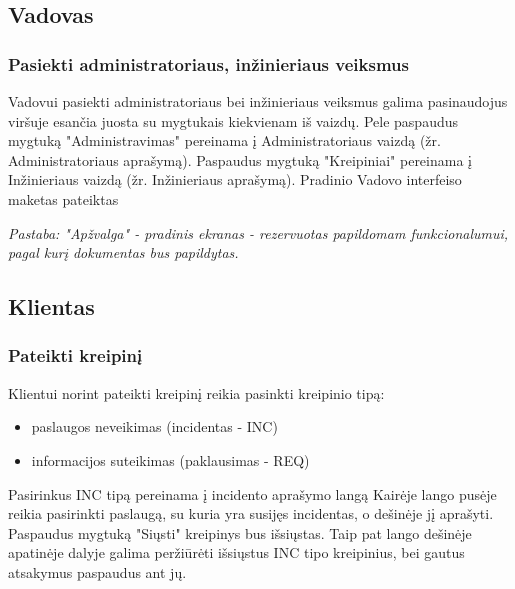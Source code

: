 

\subsection{Vadovas}

	\subsubsection{Pasiekti administratoriaus, inžinieriaus veiksmus}
		
	Vadovui pasiekti administratoriaus bei inžinieriaus veiksmus galima pasinaudojus viršuje esančia juosta su mygtukais kiekvienam iš vaizdų.
	Pele paspaudus mygtuką "Administravimas" pereinama į Administratoriaus vaizdą (žr. Administratoriaus aprašymą).
	Paspaudus mygtuką "Kreipiniai" pereinama į Inžinieriaus vaizdą (žr. Inžinieriaus aprašymą).
	Pradinio Vadovo interfeiso maketas pateiktas 
	
	\textit{Pastaba: "Apžvalga" - pradinis ekranas - rezervuotas papildomam funkcionalumui, pagal kurį dokumentas bus papildytas.}
	
	
\subsection{Klientas}

	\subsubsection{Pateikti kreipinį}
	
	Klientui norint pateikti kreipinį reikia pasinkti kreipinio tipą:
	
	\begin{itemize}
		\item paslaugos neveikimas (incidentas - INC)
		\item informacijos suteikimas (paklausimas - REQ)
	\end{itemize}
	
	Pasirinkus INC tipą pereinama į incidento aprašymo langą 
	Kairėje lango pusėje reikia pasirinkti paslaugą, su kuria yra susijęs incidentas, o dešinėje jį aprašyti.
	Paspaudus mygtuką "Siųsti" kreipinys bus išsiųstas.
	Taip pat lango dešinėje apatinėje dalyje galima peržiūrėti išsiųstus INC tipo kreipinius, bei gautus atsakymus paspaudus ant jų.
	
